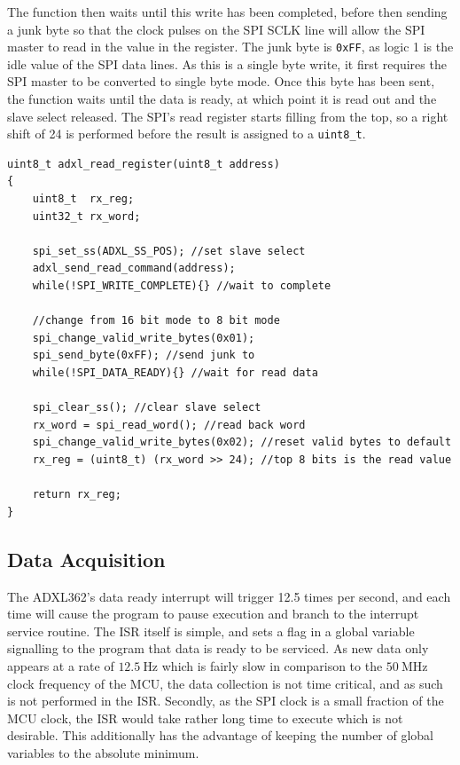 \documentclass[11pt,british]{report}
\begin{document}
The function then waits until this write has been completed, before then sending a junk byte so that the clock pulses on the SPI SCLK line will allow the SPI master to read in the value in the register. The junk byte is \texttt{0xFF}, as logic 1 is the idle value of the SPI data lines. As this is a single byte write, it first requires the SPI master to be converted to single byte mode. Once this byte has been sent, the function waits until the data is ready, at which point it is read out and the slave select released. The SPI's read register starts filling from the top, so a right shift of 24 is performed before the result is assigned to a \lstinline[style={c-style}]|uint8_t|.
\begin{lstlisting}[style={c-style}]
uint8_t adxl_read_register(uint8_t address)
{
    uint8_t  rx_reg;
	uint32_t rx_word;
	
	spi_set_ss(ADXL_SS_POS); //set slave select
	adxl_send_read_command(address);
	while(!SPI_WRITE_COMPLETE){} //wait to complete
	
	//change from 16 bit mode to 8 bit mode
	spi_change_valid_write_bytes(0x01);
	spi_send_byte(0xFF); //send junk to 
	while(!SPI_DATA_READY){} //wait for read data
	
	spi_clear_ss(); //clear slave select
	rx_word = spi_read_word(); //read back word
	spi_change_valid_write_bytes(0x02); //reset valid bytes to default
	rx_reg = (uint8_t) (rx_word >> 24); //top 8 bits is the read value
	
	return rx_reg;
}
\end{lstlisting}

\subsection*{Data Acquisition}
The ADXL362's data ready interrupt will trigger 12.5 times per second, and each time will cause the program to pause execution and branch to the interrupt service routine.
The ISR itself is simple, and sets a flag in a global variable signalling to the program that data is ready to be serviced. As new data only appears at a rate of $12.5~\si{\hertz}$ which is fairly slow in comparison to the $50~\si{\mega\hertz}$ clock frequency of the MCU, the data collection is not time critical, and as such is not performed in the ISR. Secondly, as the SPI clock is a small fraction of the MCU clock, the ISR would take rather long time to execute which is not desirable. This additionally has the advantage of keeping the number of global variables to the absolute minimum.
\end{document}
